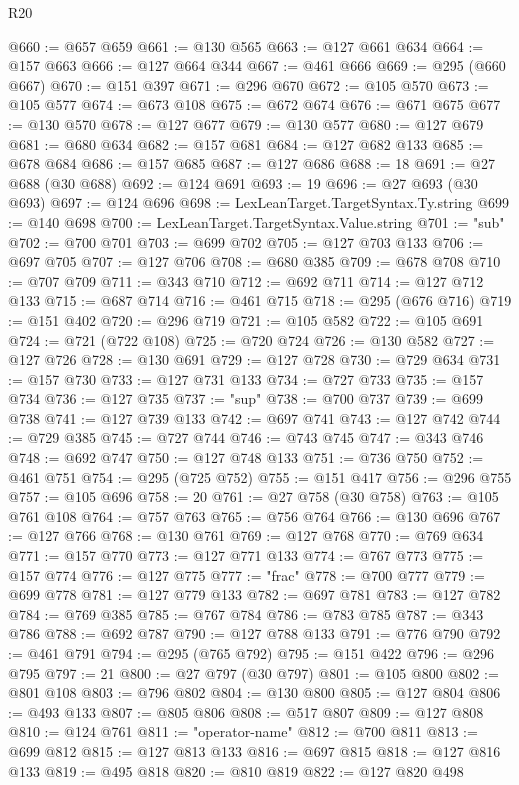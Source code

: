 \begin{lexlean}{R20}
\begin{coremodule}
@660 := @657 @659
@661 := @130 @565
@663 := @127 @661 @634
@664 := @157 @663
@666 := @127 @664 @344
@667 := @461 @666
@669 := @295 (@660 @667)
@670 := @151 @397
@671 := @296 @670
@672 := @105 @570
@673 := @105 @577
@674 := @673 @108
@675 := @672 @674
@676 := @671 @675
@677 := @130 @570
@678 := @127 @677
@679 := @130 @577
@680 := @127 @679
@681 := @680 @634
@682 := @157 @681
@684 := @127 @682 @133
@685 := @678 @684
@686 := @157 @685
@687 := @127 @686
@688 := 18
@691 := @27 @688 (@30 @688)
@692 := @124 @691
@693 := 19
@696 := @27 @693 (@30 @693)
@697 := @124 @696
@698 := LexLeanTarget.TargetSyntax.Ty.string
@699 := @140 @698
@700 := LexLeanTarget.TargetSyntax.Value.string
@701 := "sub"
@702 := @700 @701
@703 := @699 @702
@705 := @127 @703 @133
@706 := @697 @705
@707 := @127 @706
@708 := @680 @385
@709 := @678 @708
@710 := @707 @709
@711 := @343 @710
@712 := @692 @711
@714 := @127 @712 @133
@715 := @687 @714
@716 := @461 @715
@718 := @295 (@676 @716)
@719 := @151 @402
@720 := @296 @719
@721 := @105 @582
@722 := @105 @691
@724 := @721 (@722 @108)
@725 := @720 @724
@726 := @130 @582
@727 := @127 @726
@728 := @130 @691
@729 := @127 @728
@730 := @729 @634
@731 := @157 @730
@733 := @127 @731 @133
@734 := @727 @733
@735 := @157 @734
@736 := @127 @735
@737 := "sup"
@738 := @700 @737
@739 := @699 @738
@741 := @127 @739 @133
@742 := @697 @741
@743 := @127 @742
@744 := @729 @385
@745 := @727 @744
@746 := @743 @745
@747 := @343 @746
@748 := @692 @747
@750 := @127 @748 @133
@751 := @736 @750
@752 := @461 @751
@754 := @295 (@725 @752)
@755 := @151 @417
@756 := @296 @755
@757 := @105 @696
@758 := 20
@761 := @27 @758 (@30 @758)
@763 := @105 @761 @108
@764 := @757 @763
@765 := @756 @764
@766 := @130 @696
@767 := @127 @766
@768 := @130 @761
@769 := @127 @768
@770 := @769 @634
@771 := @157 @770
@773 := @127 @771 @133
@774 := @767 @773
@775 := @157 @774
@776 := @127 @775
@777 := "frac"
@778 := @700 @777
@779 := @699 @778
@781 := @127 @779 @133
@782 := @697 @781
@783 := @127 @782
@784 := @769 @385
@785 := @767 @784
@786 := @783 @785
@787 := @343 @786
@788 := @692 @787
@790 := @127 @788 @133
@791 := @776 @790
@792 := @461 @791
@794 := @295 (@765 @792)
@795 := @151 @422
@796 := @296 @795
@797 := 21
@800 := @27 @797 (@30 @797)
@801 := @105 @800
@802 := @801 @108
@803 := @796 @802
@804 := @130 @800
@805 := @127 @804
@806 := @493 @133
@807 := @805 @806
@808 := @517 @807
@809 := @127 @808
@810 := @124 @761
@811 := "operator-name"
@812 := @700 @811
@813 := @699 @812
@815 := @127 @813 @133
@816 := @697 @815
@818 := @127 @816 @133
@819 := @495 @818
@820 := @810 @819
@822 := @127 @820 @498

\end{coremodule}
\end{lexlean}
